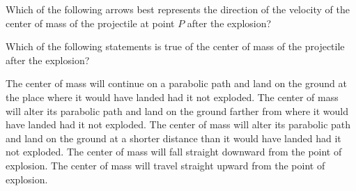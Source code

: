 \documentclass{../../oss-apphys-exam}
\begin{document}
\begin{multicols*}{2}
\begin{questions}

    \question Which of the following arrows best represents the direction of the
    velocity of the center of mass of the projectile at point $P$ after the
    explosion?
    \label{cm1}
    \begin{choices}
      \choice{\huge$\leftarrow$}
      \choice{\huge$\swarrow$}
      \choice{\huge$\searrow$}
      \choice{\huge$\rightarrow$}
      \choice{\huge$\nearrow$}
    \end{choices}
    
    \question Which of the following statements is true of the center of mass
    of the projectile after the explosion?
    \label{cm2}
    \begin{choices}
      \choice The center of mass will continue on a parabolic path and land on
      the ground at the place where it would have landed had it not exploded.
      \choice The center of mass will alter its parabolic path and land on the
      ground farther from where it would have landed had it not exploded.
      \choice The center of mass will alter its parabolic path and land on the
      ground at a shorter distance than it would have landed had it not
      exploded.
      \choice The center of mass will fall straight downward from the point of
      explosion.
      \choice The center of mass will travel straight upward from the point of
      explosion.
    \end{choices}
    \vspace{.7in}
    

\end{questions}
\end{multicols*}
\end{document}
